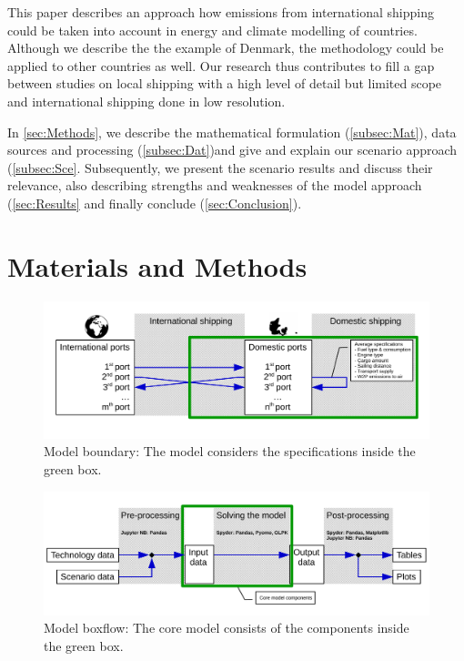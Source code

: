 \documentclass[article]{elsarticle}
\begin{document}
This paper describes an approach how emissions from international shipping could be taken into account in energy and climate modelling of countries. Although we describe the the example of Denmark, the methodology could be applied to other countries as well. Our research thus contributes to fill a gap between studies on local shipping with a high level of detail but limited scope and international shipping done in low resolution.  

In \autoref{sec:Methods}, we describe the mathematical formulation (\autoref{subsec:Mat}), data sources and processing (\autoref{subsec:Dat})and give and explain our scenario approach (\autoref{subsec:Sce}. Subsequently, we present the scenario results and discuss their relevance, also describing strengths and weaknesses of the model approach (\autoref{sec:Results} and finally conclude (\autoref{sec:Conclusion}).  

\section{Materials and Methods}
\label{sec:Methods}

\begin{figure}[htb]
    \centering
    \includegraphics[width=\textwidth]{figures/model_boundary_paper.pdf}
    \caption{Model boundary: The model considers the specifications inside the green box.}
    \label{fig:model_boundary}
\end{figure}

\begin{figure}[htb]
    \centering
    \includegraphics[width=\textwidth]{figures/model_boxflow_paper.pdf}
    \caption{Model boxflow: The core model consists of the components inside the green box.}
    \label{fig:model_boxflow}
\end{figure}
\end{document}
